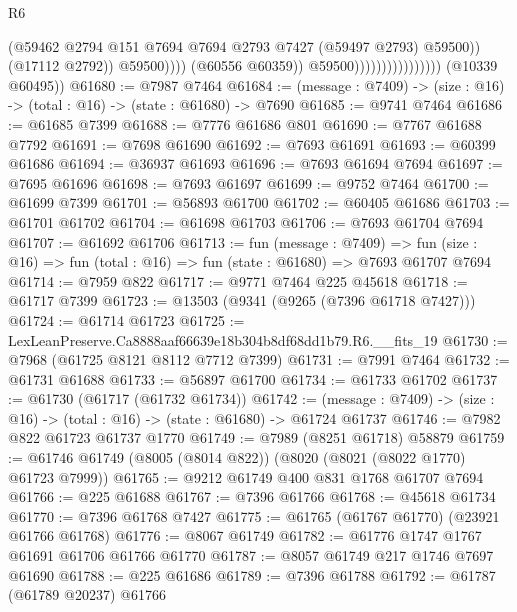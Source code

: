 \begin{lexlean}{R6}
\begin{coremodule}
                                                    (@59462
                                                      @2794
                                                      @151
                                                      @7694
                                                      @7694
                                                      @2793
                                                      @7427
                                                      (@59497 @2793)
                                                      @59500))
                                                  (@17112 @2792))
                                                @59500))))
                                        (@60556 @60359))
                                      @59500))))))))))))))))
      (@10339 @60495))
@61680 := @7987 @7464
@61684 := (message : @7409) -> (size : @16) -> (total : @16) -> (state : @61680) -> @7690
@61685 := @9741 @7464
@61686 := @61685 @7399
@61688 := @7776 @61686 @801
@61690 := @7767 @61688 @7792
@61691 := @7698 @61690
@61692 := @7693 @61691
@61693 := @60399 @61686
@61694 := @36937 @61693
@61696 := @7693 @61694 @7694
@61697 := @7695 @61696
@61698 := @7693 @61697
@61699 := @9752 @7464
@61700 := @61699 @7399
@61701 := @56893 @61700
@61702 := @60405 @61686
@61703 := @61701 @61702
@61704 := @61698 @61703
@61706 := @7693 @61704 @7694
@61707 := @61692 @61706
@61713 := fun (message : @7409) =>
  fun (size : @16) => fun (total : @16) => fun (state : @61680) => @7693 @61707 @7694
@61714 := @7959 @822
@61717 := @9771 @7464 @225 @45618
@61718 := @61717 @7399
@61723 := @13503 (@9341 (@9265 (@7396 @61718 @7427)))
@61724 := @61714 @61723
@61725 := LexLeanPreserve.Ca8888aaf66639e18b304b8df68dd1b79.R6.__fits_19
@61730 := @7968 (@61725 @8121 @8112 @7712 @7399)
@61731 := @7991 @7464
@61732 := @61731 @61688
@61733 := @56897 @61700
@61734 := @61733 @61702
@61737 := @61730 (@61717 (@61732 @61734))
@61742 := (message : @7409) -> (size : @16) -> (total : @16) -> (state : @61680) -> @61724 @61737
@61746 := @7982 @822 @61723 @61737 @1770
@61749 := @7989 (@8251 @61718) @58879
@61759 := @61746 @61749 (@8005 (@8014 @822)) (@8020 (@8021 (@8022 @1770) @61723 @7999))
@61765 := @9212 @61749 @400 @831 @1768 @61707 @7694
@61766 := @225 @61688
@61767 := @7396 @61766
@61768 := @45618 @61734
@61770 := @7396 @61768 @7427
@61775 := @61765 (@61767 @61770) (@23921 @61766 @61768)
@61776 := @8067 @61749
@61782 := @61776 @1747 @1767 @61691 @61706 @61766 @61770
@61787 := @8057 @61749 @217 @1746 @7697 @61690
@61788 := @225 @61686
@61789 := @7396 @61788
@61792 := @61787 (@61789 @20237) @61766

\end{coremodule}
\end{lexlean}
